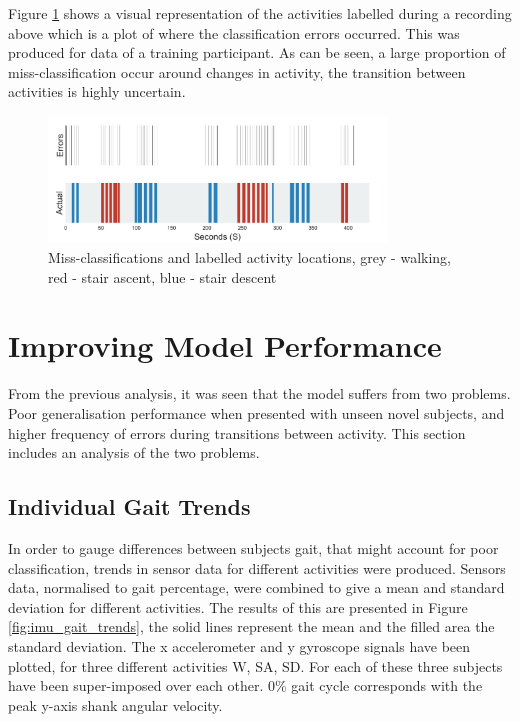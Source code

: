 \documentclass[sensors,article,submit,moreauthors,pdftex]{Definitions/mdpi}
\begin{document}
Figure \ref{fig:missclassification} shows a visual representation of the activities labelled during a recording above which is a plot of where the classification errors occurred. This was produced for data of a training participant. As can be seen, a large proportion of miss-classification occur around changes in activity, the transition between activities is highly uncertain.

\begin{figure}[!htb]
    \centering
    \includegraphics[width=0.8\textwidth]{Figures/results/location_of_errors.jpg}
    \caption{Miss-classifications and labelled activity locations, grey - walking, red - stair ascent, blue - stair descent}
    \label{fig:missclassification}
\end{figure}



\section{Improving Model Performance}
\label{sec:improving_perfromance}
From the previous analysis, it was seen that the model suffers from two problems. Poor generalisation performance when presented with unseen novel subjects, and higher frequency of errors during transitions between activity. This section includes an analysis of the two problems.

\subsection{Individual Gait Trends}
In order to gauge differences between subjects gait, that might account for poor classification, trends in sensor data for different activities were produced. Sensors data, normalised to gait percentage, were combined to give a mean and standard deviation for different activities. The results of this are presented in Figure \ref{fig:imu_gait_trends}, the solid lines represent the mean and the filled area the standard deviation. The x accelerometer and y gyroscope signals have been plotted, for three different activities W, SA, SD. For each of these three subjects have been super-imposed over each other. 0\% gait cycle corresponds with the peak y-axis shank angular velocity.
\end{document}
